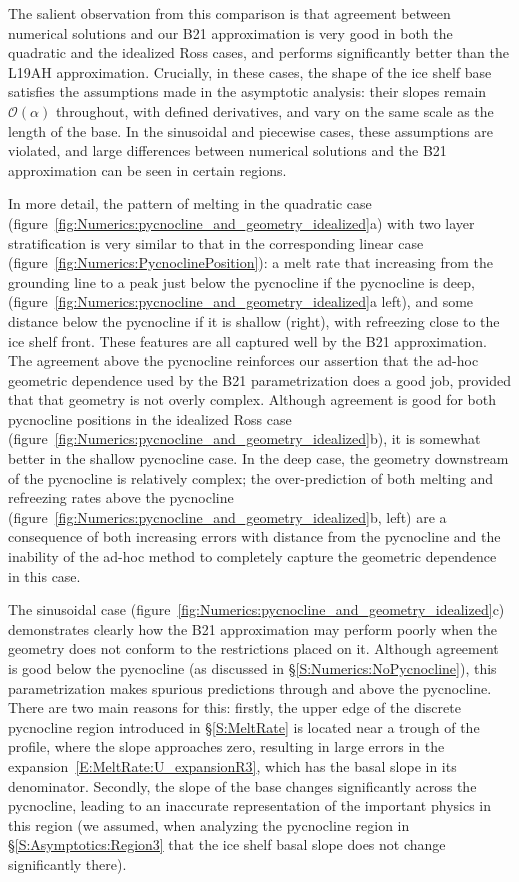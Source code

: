 \documentclass[openacc]{rsproca_new}%
\newcommand{\order}[1]{\mathcal{O}(#1)}
\begin{document}
The salient observation from this comparison is that agreement between numerical solutions and our B21 approximation is very good in both the quadratic and the idealized Ross cases, and performs significantly better than the L19AH approximation. Crucially, in these cases, the shape of the ice shelf base satisfies the assumptions made in the asymptotic analysis: their slopes remain $\order{\alpha}$ throughout, with defined derivatives, and vary on the same scale as the length of the base. In the sinusoidal and piecewise cases, these assumptions are violated, and large differences between numerical solutions and the B21 approximation can be seen in certain regions.

In more detail, the pattern of melting in the quadratic case (figure~\ref{fig:Numerics:pycnocline_and_geometry_idealized}a) with two layer stratification is very similar to that in the corresponding linear case (figure~\ref{fig:Numerics:PycnoclinePosition}): a melt rate that increasing from the grounding line to a peak just below the pycnocline if the pycnocline is deep, (figure~\ref{fig:Numerics:pycnocline_and_geometry_idealized}a left), and some distance below the pycnocline if it is shallow (right), with refreezing close to the ice shelf front. These features are all captured well by the B21 approximation. The agreement above the pycnocline reinforces our assertion that the ad-hoc geometric dependence used by the B21 parametrization does a good job, provided that that geometry is not overly complex.
Although agreement is good for both pycnocline positions in the idealized Ross case (figure~\ref{fig:Numerics:pycnocline_and_geometry_idealized}b), it is somewhat better in the shallow pycnocline case. In the deep case, the geometry downstream of the pycnocline is relatively complex; the over-prediction of both melting and refreezing rates above the pycnocline (figure~\ref{fig:Numerics:pycnocline_and_geometry_idealized}b, left) are a consequence of both increasing errors with distance from the pycnocline and the inability of the ad-hoc method to completely capture the geometric dependence in this case. 

The sinusoidal case (figure~\ref{fig:Numerics:pycnocline_and_geometry_idealized}c) demonstrates clearly how the B21 approximation may perform poorly when the geometry does not conform to the restrictions placed on it. Although agreement is good below the pycnocline (as discussed in \S\ref{S:Numerics:NoPycnocline}), this parametrization makes spurious predictions through and above the pycnocline. There are two main reasons for this: firstly, the upper edge of the discrete pycnocline region introduced in \S\ref{S:MeltRate} is located near a trough of the profile, where the slope approaches zero, resulting in large errors in the expansion~\eqref{E:MeltRate:U_expansionR3}, which has the basal slope in its denominator.  Secondly, the slope of the base changes significantly across the pycnocline, leading to an inaccurate representation of the important physics in this region (we assumed, when analyzing the pycnocline region in \S\ref{S:Asymptotics:Region3} that the ice shelf basal slope does not change significantly there).
\end{document}
